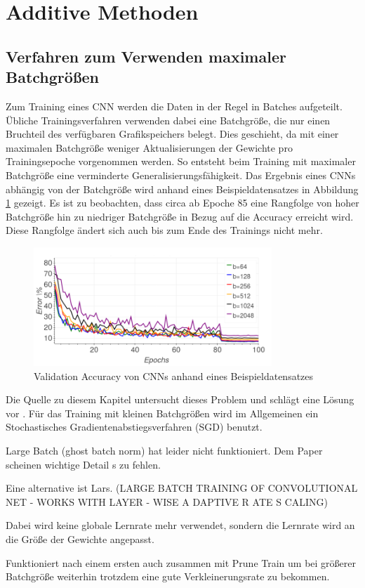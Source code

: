 \section{Additive Methoden}
\label{sec:add}
\subsection{Verfahren zum Verwenden maximaler Batchgrößen}
Zum Training eines CNN werden die Daten in der Regel in Batches aufgeteilt. Übliche Trainingsverfahren verwenden dabei eine Batchgröße, die nur einen Bruchteil des verfügbaren Grafikspeichers belegt. Dies geschieht, da mit einer maximalen Batchgröße weniger Aktualisierungen der Gewichte pro Trainingsepoche vorgenommen werden. So entsteht beim Training mit maximaler Batchgröße eine verminderte Generalisierungsfähigkeit. Das Ergebnis eines CNNs abhängig von der Batchgröße wird anhand eines Beispieldatensatzes in Abbildung \ref{abb:largeB1} gezeigt. Es ist zu beobachten, dass circa ab Epoche 85 eine Rangfolge von hoher Batchgröße hin zu niedriger Batchgröße in Bezug auf die Accuracy erreicht wird. Diese Rangfolge ändert sich auch bis zum Ende des Trainings nicht mehr. 


\begin{figure}[h]
 \centering
 \includegraphics[width=0.8\textwidth]{KapitelPartA/images/batchSize1.png}
 \caption{Validation Accuracy von CNNs anhand eines Beispieldatensatzes}
 \label{abb:largeB1}
\end{figure}


Die Quelle zu diesem Kapitel untersucht dieses Problem und schlägt eine Lösung vor \cite{lars}.
Für das Training mit kleinen Batchgrößen wird im Allgemeinen ein Stochastisches Gradientenabstiegsverfahren (SGD) benutzt. 


Large Batch (ghost batch norm) hat leider nicht funktioniert. Dem Paper scheinen wichtige Detail s zu fehlen.

Eine alternative ist Lars. (LARGE BATCH TRAINING OF CONVOLUTIONAL NET -
WORKS WITH LAYER - WISE A DAPTIVE R ATE S CALING)

Dabei wird keine globale Lernrate mehr verwendet, sondern die Lernrate wird an die Größe der Gewichte angepasst. 

Funktioniert nach einem ersten auch zusammen mit Prune Train um bei größerer Batchgröße weiterhin trotzdem eine gute Verkleinerungsrate zu bekommen.
\color{black}
